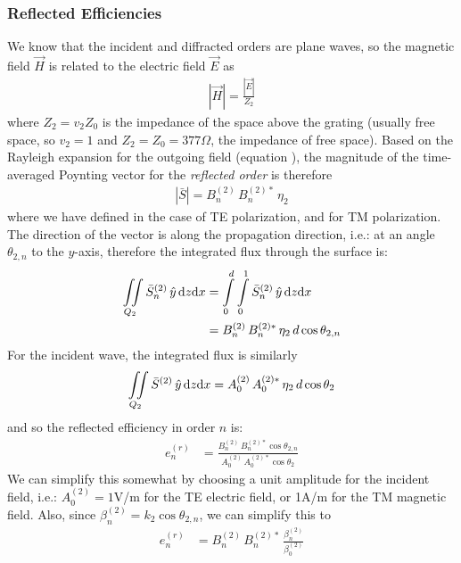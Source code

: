 \subsubsection{Reflected Efficiencies}
We know that the incident and diffracted orders are plane waves, so the magnetic field $\vec H$ is related to the electric field $\vec E$ as
\begin{align}
\left| \vec H \right| = \frac{\left| \vec E \right|}{Z_2}
\end{align}
where $Z_2 = v_2 Z_0$ is the impedance of the space above the grating (usually free space, so $v_2=1$ and $Z_2 = Z_0 = 377\Omega$, the impedance of free space). Based on the Rayleigh expansion for the outgoing field (equation ), the magnitude of the time-averaged Poynting vector for the \emph{reflected order} is therefore
\begin{align}
\left| \bar S \right| = B_n^{(2)} \, B_n^{(2)\ast} \, \eta_2
\end{align}
where we have defined  in the case of TE polarization, and  for TM polarization.  The direction of the vector is along the propagation direction, i.e.: at an angle $\theta_{2,n}$ to the $y$-axis, therefore the integrated flux through the surface is:
\begin{align}
\iint \limits_{Q_2} \bar S_n^{(2)} \, \hat y \, \mathrm{d} z \mathrm{d} x &= \int \limits_0^d \int \limits_0^1 \bar S_n^{(2)} \, \hat y \, \mathrm{d} z \mathrm{d} x \\
&= B_n^{(2)} \, B_n^{(2)\ast} \, \eta_2 \, d \cos \theta_{2,n} 
\end{align}
For the incident wave, the integrated flux is similarly 
\begin{align}
\iint \limits_{Q_2} \bar S^{(2)} \, \hat y \, \mathrm{d} z \mathrm{d} x = A_0^{(2)} \, A_0^{(2)\ast} \, \eta_2 \, d \cos \theta_{2} 
\end{align}
and so the reflected efficiency in order $n$ is:
\begin{align}
e_n^{(r)} &= \frac{    B_n^{(2)} \, B_n^{(2)\ast} \cos \theta_{2,n}       }{    A_0^{(2)} \, A_0^{(2)\ast}  \cos \theta_{2}     }
\end{align}
We can simplify this somewhat by choosing a unit amplitude for the incident field, i.e.: $A_0^{(2)} = 1$V/m for the TE electric field, or 1A/m for the TM magnetic field. Also, since $\beta_n^{(2)} = k_2 \cos \theta_{2,n}$, we can simplify this to
\begin{align}
e_n^{(r)} &= B_n^{(2)} \, B_n^{(2)\ast} \, \frac{     \beta_n^{(2)}       }{    \beta_0^{(2)}      }
\label{eqnEffR}
\end{align}



